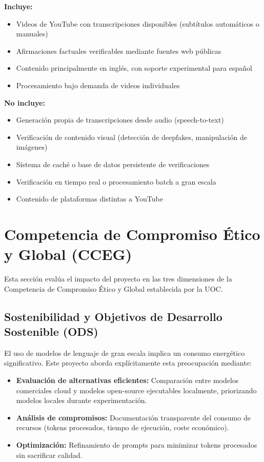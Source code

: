 \documentclass[12pt,a4paper]{article}
\begin{document}
\textbf{Incluye:}
\begin{itemize}
    \item Videos de YouTube con transcripciones disponibles (subtítulos automáticos o manuales)
    \item Afirmaciones factuales verificables mediante fuentes web públicas
    \item Contenido principalmente en inglés, con soporte experimental para español
    \item Procesamiento bajo demanda de videos individuales
\end{itemize}

\textbf{No incluye:}
\begin{itemize}
    \item Generación propia de transcripciones desde audio (speech-to-text)
    \item Verificación de contenido visual (detección de deepfakes, manipulación de imágenes)
    \item Sistema de caché o base de datos persistente de verificaciones
    \item Verificación en tiempo real o procesamiento batch a gran escala
    \item Contenido de plataformas distintas a YouTube
\end{itemize}

\section{Competencia de Compromiso Ético y Global (CCEG)}

Esta sección evalúa el impacto del proyecto en las tres dimensiones de la Competencia de Compromiso Ético y Global establecida por la UOC.

\subsection{Sostenibilidad y Objetivos de Desarrollo Sostenible (ODS)}

El uso de modelos de lenguaje de gran escala implica un consumo energético significativo. Este proyecto aborda explícitamente esta preocupación mediante:

\begin{itemize}
    \item \textbf{Evaluación de alternativas eficientes:} Comparación entre modelos comerciales cloud y modelos open-source ejecutables localmente, priorizando modelos locales durante experimentación.

    \item \textbf{Análisis de compromisos:} Documentación transparente del consumo de recursos (tokens procesados, tiempo de ejecución, coste económico).

    \item \textbf{Optimización:} Refinamiento de prompts para minimizar tokens procesados sin sacrificar calidad.
\end{itemize}
\end{document}
